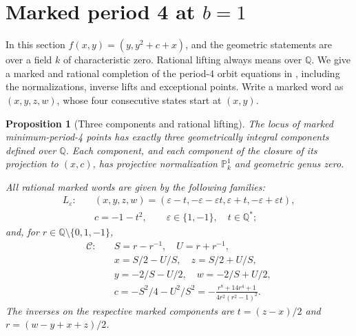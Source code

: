 \documentclass{jT}
\newcommand{\Q}{\mathbb Q}
\newcommand{\PP}{\mathbb P}
\newtheorem{proposition}{Proposition}[section]
\begin{document}
\section{Marked period 4 at \texorpdfstring{$b=1$}{b=1}}\label{sec:period4}
In this section $f(x,y)=(y,y^2+c+x)$, and the geometric statements are over a field $k$ of characteristic zero. Rational lifting always means over $\Q$. We give a marked and rational completion of the period-4 orbit equations in \cite[eqs.~(2)--(8)]{endler-gallas}, including the normalizations, inverse lifts and exceptional points. Write a marked word as $(x,y,z,w)$, whose four consecutive states start at $(x,y)$.
\begin{proposition}[Three components and rational lifting]\label{prop:period4}
The locus of marked minimum-period-4 points has exactly three geometrically integral components defined over $\Q$. Each component, and each component of the closure of its projection to $(x,c)$, has projective normalization $\PP^1_k$ and geometric genus zero.

All rational marked words are given by the following families:
\begin{equation}\label{eq:p4-lines}
\begin{aligned}
L_\varepsilon:\quad &(x,y,z,w)=(\varepsilon-t,-\varepsilon-\varepsilon t,
 \varepsilon+t,-\varepsilon+\varepsilon t),\\
&c=-1-t^2,\qquad \varepsilon\in\{1,-1\},\quad t\in\Q^*;
\end{aligned}
\end{equation}
and, for $r\in\Q\setminus\{0,1,-1\}$,
\begin{equation}\label{eq:p4-conic}
\begin{aligned}
\mathcal C:\quad&S=r-r^{-1},\quad U=r+r^{-1},\\
&x=S/2-U/S,\quad z=S/2+U/S,\\
&y=-2/S-U/2,\quad w=-2/S+U/2,\\
&c=-S^2/4-U^2/S^2
=-\frac{r^8+14r^4+1}{4r^2(r^2-1)^2}.
\end{aligned}
\end{equation}
The inverses on the respective marked components are $t=(z-x)/2$ and $r=(w-y+x+z)/2$.
\end{proposition}
\end{document}
